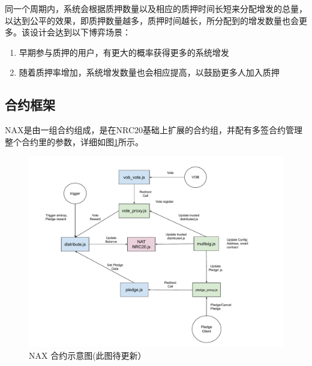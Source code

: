同一个周期内，系统会根据质押数量以及相应的质押时间长短来分配增发的总量，以达到公平的效果，即质押数量越多，质押时间越长，所分配到的增发数量也会更多。该设计会达到以下博弈场景：
\begin{enumerate}
  \item 早期参与质押的用户，有更大的概率获得更多的系统增发
  \item 随着质押率增加，系统增发数量也会相应提高，以鼓励更多人加入质押
\end{enumerate}

\subsection{合约框架}
NAX是由一组合约组成，是在NRC20基础上扩展的合约组，并配有多签合约管理整个合约里的参数，详细如图\ref{fig:nax_framework}所示。

\begin{figure}[htbp]
  \centering
    \includegraphics[width=1\textwidth]{../common/zh/nax.pdf}
    \caption{NAX 合约示意图(此图待更新） \label{fig:nax_framework}}
\end{figure}
